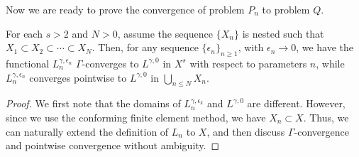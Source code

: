 \documentclass{amsart}
\begin{document}
Now we are ready to prove the convergence of problem $P_n$ to problem $Q$.
\begin{theorem}\label{P_n_star_Q}
    For each $s>2$ and $N>0$, assume the sequence $\{X_n\}$ is nested such that $X_1\subset X_2\subset\cdots\subset X_N$. Then, for any sequence $ \{\epsilon_n\}_{n \geq 1} $, with $ \epsilon_n \to 0 $, we have the functional \( L_n^{\gamma,{\epsilon_n}} \) \(\Gamma\)-converges to \( L^{\gamma,0} \) in $X^s$ with respect to  parameters $n$, while \( L_n^{\gamma,{\epsilon_n}} \) converges pointwise to \( L^{\gamma,0} \) in $\bigcup_{n\leq N} X_n$.
\end{theorem}
\begin{proof}
    We first note that the domains of \( L_n^{\gamma,{\epsilon_k}} \) and \( L^{\gamma,0} \) are different. However, since we use the conforming finite element method, we have \( X_n \subset X \). Thus, we can naturally extend the definition of \( L_n \) to \( X \), and then discuss \(\Gamma\)-convergence and pointwise convergence without ambiguity. 
    

\end{proof}
\end{document}
